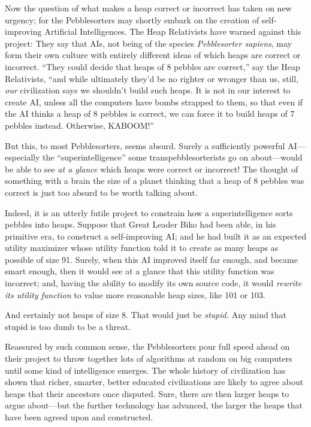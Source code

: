 {
 Now the question of what makes a heap correct or incorrect has
taken on new urgency; for the Pebblesorters may shortly embark on the
creation of self-improving Artificial Intelligences. The Heap
Relativists have warned against this project: They say that AIs, not
being of the species \textit{Pebblesorter sapiens}, may form their own
culture with entirely different ideas of which heaps are correct or
incorrect. ``They could decide that heaps of 8 pebbles
are correct,'' say the Heap Relativists,
``and while ultimately they'd be no
righter or wronger than us, still, \textit{our} civilization says we
shouldn't build such heaps. It is not in our interest
to create AI, unless all the computers have bombs strapped to them, so
that even if the AI thinks a heap of 8 pebbles is correct, we can force
it to build heaps of 7 pebbles instead. Otherwise,
KABOOM!''}

{
 But this, to most Pebblesorters, seems absurd. Surely a
sufficiently powerful AI---especially the
``superintelligence'' some
transpebblesorterists go on about---would be able to see \textit{at a
glance} which heaps were correct or incorrect! The thought of something
with a brain the size of a planet thinking that a heap of 8 pebbles was
correct is just too absurd to be worth talking about.}

{
 Indeed, it is an utterly futile project to constrain how a
superintelligence sorts pebbles into heaps. Suppose that Great Leader
Biko had been able, in his primitive era, to construct a self-improving
AI; and he had built it as an expected utility maximizer whose utility
function told it to create as many heaps as possible of size 91.
Surely, when this AI improved itself far enough, and became smart
enough, then it would see at a glance that this utility function was
incorrect; and, having the ability to modify its own source code, it
would \textit{rewrite its utility function} to value more reasonable
heap sizes, like 101 or 103.}

{
 And certainly not heaps of size 8. That would just be
\textit{stupid.} Any mind that stupid is too dumb to be a threat.}

{
 Reassured by such common sense, the Pebblesorters pour full speed
ahead on their project to throw together lots of algorithms at random
on big computers until some kind of intelligence emerges. The whole
history of civilization has shown that richer, smarter, better educated
civilizations are likely to agree about heaps that their ancestors once
disputed. Sure, there are then larger heaps to argue about---but the
further technology has advanced, the larger the heaps that have been
agreed upon and constructed.}

